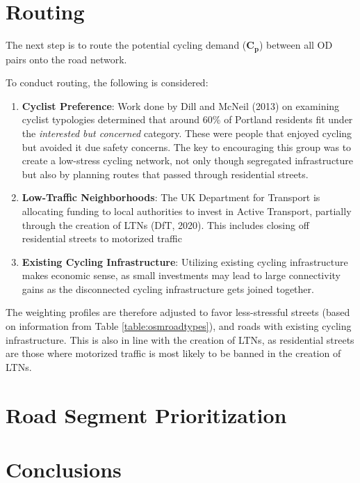 \documentclass[]{elsarticle} %
\providecommand{\tightlist}{%
  \setlength{\itemsep}{0pt}\setlength{\parskip}{0pt}}
\begin{document}
\hypertarget{routing}{%
\section{Routing}\label{routing}}

The next step is to route the potential cycling demand
(\(\boldsymbol{C_{p}}\)) between all OD pairs onto the road network.

To conduct routing, the following is considered:

\begin{enumerate}
\def\labelenumi{\arabic{enumi}.}
\tightlist
\item
  \textbf{Cyclist Preference}: Work done by Dill and McNeil (2013) on
  examining cyclist typologies determined that around 60\% of Portland
  residents fit under the \emph{interested but concerned} category.
  These were people that enjoyed cycling but avoided it due safety
  concerns. The key to encouraging this group was to create a low-stress
  cycling network, not only though segregated infrastructure but also by
  planning routes that passed through residential streets.
\item
  \textbf{Low-Traffic Neighborhoods}: The UK Department for Transport is
  allocating funding to local authorities to invest in Active Transport,
  partially through the creation of LTNs (DfT, 2020). This includes
  closing off residential streets to motorized traffic
\item
  \textbf{Existing Cycling Infrastructure}: Utilizing existing cycling
  infrastructure makes economic sense, as small investments may lead to
  large connectivity gains as the disconnected cycling infrastructure
  gets joined together.
\end{enumerate}

The weighting profiles are therefore adjusted to favor less-stressful
streets (based on information from Table \ref{table:osmroadtypes}), and
roads with existing cycling infrastructure. This is also in line with
the creation of LTNs, as residential streets are those where motorized
traffic is most likely to be banned in the creation of LTNs.

\hypertarget{road-segment-prioritization}{%
\section{Road Segment
Prioritization}\label{road-segment-prioritization}}

\hypertarget{conclusions}{%
\section{Conclusions}\label{conclusions}}
\end{document}
